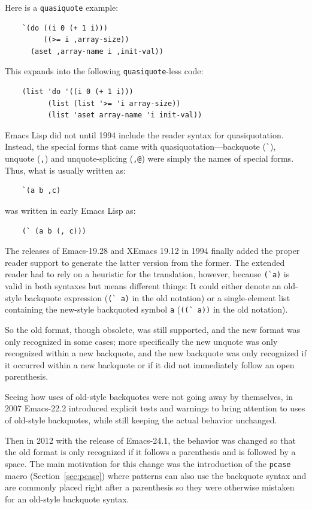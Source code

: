 \documentclass[format=acmsmall, review]{acmart}
\newcommand \Elisp {Emacs Lisp}
\begin{document}
Here is a \texttt{quasiquote} example:
%
\begin{verbatim}
    `(do ((i 0 (+ 1 i)))
         ((>= i ,array-size))
      (aset ,array-name i ,init-val))
\end{verbatim}
%
This expands into the following \texttt{quasiquote}-less code:
%
\begin{verbatim}
    (list 'do '((i 0 (+ 1 i)))
          (list (list '>= 'i array-size))
          (list 'aset array-name 'i init-val))
\end{verbatim}
%
\Elisp{} did not until 1994 include the reader syntax for
quasiquotation.
Instead, the special forms that came with quasiquotation---backquote
(\verb|`|), unquote (\verb|,|) and unquote-splicing (\verb|,@|) were
simply the names of special forms.   Thus, what is usually written as:
\begin{verbatim}
    `(a b ,c)
\end{verbatim}
was written in early \Elisp{} as:
\begin{verbatim}
    (` (a b (, c)))
\end{verbatim}
The releases of Emacs-19.28 and XEmacs 19.12 in 1994 finally added the
proper reader support to generate the latter version from the former.
The extended reader had to rely on a heuristic for the translation, however,
because \verb|(`a)| is valid in both syntaxes but means different
things: It could either denote an old-style backquote expression
(\verb|(` a)| in the old notation) or a single-element list containing
the new-style backquoted symbol \texttt{a} (\verb|((` a))| in the old
notation).

So the old format, though obsolete, was still supported, and the
new format was only recognized in some cases; more specifically the new
unquote was only recognized within a new backquote, and the new
backquote was only recognized if it occurred within a new backquote or
if it did not immediately follow an open parenthesis.

Seeing how uses of old-style backquotes were not going away by themselves,
in 2007
Emacs-22.2 introduced explicit tests and warnings to bring attention to uses
of old-style backquotes, while still keeping the actual behavior unchanged.

Then in 2012 with the release of Emacs-24.1, the behavior was changed so
that the old format is only recognized if it follows a parenthesis and is
followed by a space.  The main motivation for this change was the
introduction of the \texttt{pcase} macro (Section~\ref{sec:pcase}) where
patterns can also use the
backquote syntax and are commonly placed right after a parenthesis so they
were otherwise mistaken for an old-style backquote syntax.
\end{document}
